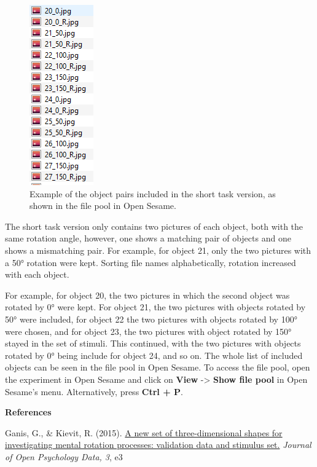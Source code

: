 \documentclass[
]{book}
\begin{document}
\begin{figure}

{\centering \includegraphics[width=0.2\linewidth]{images/RotationNumberList} 

}

\caption{Example of the object pairs included in the short task version, as shown in the file pool in Open Sesame.}\label{fig:Figure5-3}
\end{figure}

The short task version only contains two pictures of each object, both with the same rotation angle, however, one shows a matching pair of objects and one shows a mismatching pair. For example, for object 21, only the two pictures with a 50° rotation were kept. Sorting file names alphabetically, rotation increased with each object.

For example, for object 20, the two pictures in which the second object was rotated by 0° were kept. For object 21, the two pictures with objects rotated by 50° were included, for object 22 the two pictures with objects rotated by 100° were chosen, and for object 23, the two pictures with object rotated by 150° stayed in the set of stimuli. This continued, with the two pictures with objects rotated by 0° being include for object 24, and so on. The whole list of included objects can be seen in the file pool in Open Sesame. To access the file pool, open the experiment in Open Sesame and click on \textbf{View} -\textgreater{} \textbf{Show file pool} in Open Sesame's menu. Alternatively, press \textbf{Ctrl + P}.

\textbf{References}

Ganis, G., \& Kievit, R. (2015). \href{https://openpsychologydata.metajnl.com/articles/10.5334/jopd.ai/}{A new set of three-dimensional shapes for investigating mental rotation processes: validation data and stimulus set.} \emph{Journal of Open Psychology Data, 3}, e3
\end{document}
